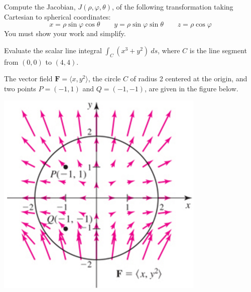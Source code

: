 \documentclass[12pt, addpoints]{exam/exam}
\newcommand{\vect}[1]{\mathbf{#1}}
\theoremstyle{plain}
\begin{document}
\begin{questions}
\thispagestyle{headandfoot}

\question[16] %
Compute the Jacobian, $J(\rho,\varphi,\theta)$, of the following transformation taking Cartesian to spherical coordinates:
\[
x = \rho \sin{\varphi}\cos{\theta} \qquad
y = \rho \sin{\varphi}\sin{\theta} \qquad
z = \rho \cos{\varphi}
\]
You must show your work and simplify.

\newpage

\question[16] %
Evaluate the scalar line integral 
$\int_C(x^3+y^2)\ ds$, 
where $C$ is the line segment from 
$(0,0)$ to $(4,4)$.

\newpage

\question %
The vector field $\vect F=\langle x,y^2\rangle$, the circle $C$ of radius 2 centered at the origin, and two points $P=(-1,1)$ and $Q=(-1,-1)$, are given in the figure below.

\vspace{-1pc}
\begin{center}
\includegraphics[scale=0.6]{14-5Exam3}
\end{center}

\end{questions}
\end{document}
